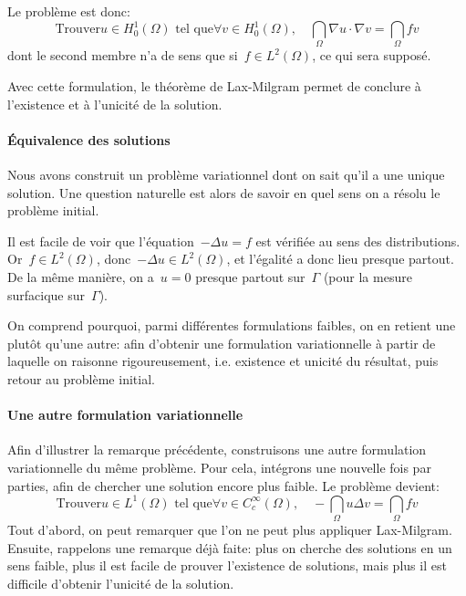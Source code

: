 Le problème est donc:
\begin{equation}
\text{Trouver}u\in H^1_0(\Omega) \text{ tel que}
\forall v\in H^1_0(\Omega),\quad
\dint_\Omega \nabla u\cdot\nabla v = \dint_\Omega fv
\end{equation}
dont le second membre n'a de sens que si~$f\in L^2(\Omega)$, ce qui
sera supposé.

Avec cette formulation, le théorème de Lax-Milgram permet de conclure
à l'existence et à l'unicité de la solution.

\medskip{}
\paragraph{Équivalence des solutions}
Nous avons construit un problème variationnel dont on sait qu'il a une
unique solution.
Une question naturelle est alors de savoir en quel sens on a résolu le problème initial.

Il est facile de voir que l'équation~$-\Delta u = f$ est vérifiée au sens des distributions.
Or~$f\in L^2(\Omega)$, donc~$-\Delta u \in L^2(\Omega)$, et l'égalité a donc lieu presque
partout.
De la même manière, on a~$u = 0$ presque partout sur~$\Gamma$ (pour la mesure
surfacique sur~$\Gamma$).

On comprend pourquoi, parmi différentes formulations faibles, on en retient une
plutôt qu'une autre: afin d'obtenir une formulation variationnelle à partir de laquelle
on raisonne rigoureusement, i.e. existence et unicité du résultat, puis retour au problème
initial.

\medskip{}
\paragraph{Une autre formulation variationnelle}
Afin d'illustrer la remarque précédente, construisons une autre formulation
variationnelle du même problème.
Pour cela, intégrons une nouvelle fois par parties, afin de chercher
une solution encore plus faible.
Le problème devient:
\begin{equation}
\text{Trouver}u\in L^1(\Omega) \text{ tel que}
\forall v\in C_c^\infty(\Omega),\quad
-\dint_\Omega u\Delta v = \dint_\Omega fv
\end{equation}
Tout d'abord, on peut remarquer que l'on ne peut plus appliquer Lax-Milgram.
Ensuite, rappelons une remarque déjà faite:
plus on cherche des solutions en un sens faible, plus il est facile de prouver l'existence
de solutions, mais plus il est difficile d'obtenir l'unicité de la solution.

